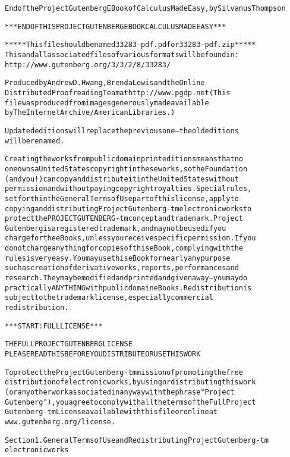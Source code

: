 \documentclass[12pt]{book}[2005/09/16]
\newenvironment{PGtext}{%
\begin{alltt}
\fontsize{9.2}{10.5}\ttfamily\selectfont}%
{\end{alltt}}
\begin{document}
\begin{PGtext}
End of the Project Gutenberg EBook of Calculus Made Easy, by Silvanus Thompson

*** END OF THIS PROJECT GUTENBERG EBOOK CALCULUS MADE EASY ***

***** This file should be named 33283-pdf.pdf or 33283-pdf.zip *****
This and all associated files of various formats will be found in:
        http://www.gutenberg.org/3/3/2/8/33283/

Produced by Andrew D. Hwang, Brenda Lewis and the Online
Distributed Proofreading Team at http://www.pgdp.net (This
file was produced from images generously made available
by The Internet Archive/American Libraries.)


Updated editions will replace the previous one--the old editions
will be renamed.

Creating the works from public domain print editions means that no
one owns a United States copyright in these works, so the Foundation
(and you!) can copy and distribute it in the United States without
permission and without paying copyright royalties.  Special rules,
set forth in the General Terms of Use part of this license, apply to
copying and distributing Project Gutenberg-tm electronic works to
protect the PROJECT GUTENBERG-tm concept and trademark.  Project
Gutenberg is a registered trademark, and may not be used if you
charge for the eBooks, unless you receive specific permission.  If you
do not charge anything for copies of this eBook, complying with the
rules is very easy.  You may use this eBook for nearly any purpose
such as creation of derivative works, reports, performances and
research.  They may be modified and printed and given away--you may do
practically ANYTHING with public domain eBooks.  Redistribution is
subject to the trademark license, especially commercial
redistribution.



*** START: FULL LICENSE ***

THE FULL PROJECT GUTENBERG LICENSE
PLEASE READ THIS BEFORE YOU DISTRIBUTE OR USE THIS WORK

To protect the Project Gutenberg-tm mission of promoting the free
distribution of electronic works, by using or distributing this work
(or any other work associated in any way with the phrase "Project
Gutenberg"), you agree to comply with all the terms of the Full Project
Gutenberg-tm License available with this file or online at
  www.gutenberg.org/license.


Section 1.  General Terms of Use and Redistributing Project Gutenberg-tm
electronic works


\end{PGtext}
\end{document}

